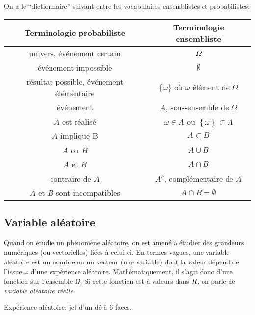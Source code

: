  
On a le ``dictionnaire'' suivant entre les vocabulaires ensemblistes et probabilistes:
\begin{center}
\begin{tabular}{cc}
\hline Terminologie probabiliste & Terminologie ensembliste \\
\hline
univers, événement certain& $\Omega$ \\
événement impossible  & $\emptyset$ \\
résultat possible, événement élémentaire & $\{\omega\}$ où $\omega$ élément de  $\Omega$ \\
événement & $A$, sous-ensemble de  $\Omega$ \\
$A$  est réalisé & $\omega \in A$ ou $\left\{ \omega \right\} \subset A $\\
$A$  implique  B & $A \subset B$\\
$A$  ou  $B$ & $A \cup B$ \\
$A$  et  $B$ & $A \cap B$ \\
contraire de  $A$ & $A^c$, complémentaire de  $A$ \\
$A$  et  $B$  sont incompatibles & $A \cap B = \emptyset$
\\ \hline
\end{tabular}
\end{center}

\sld{\vfill\pagebreak[5]}%

\subsection{Variable aléatoire}

Quand on étudie un phénomène aléatoire, on est amené à étudier des grandeurs numériques (ou vectorielles) liées à celui-ci. En termes vagues, une variable aléatoire est un nombre ou un vecteur (une variable) dont la valeur dépend de l'issue $\omega$ d'une expérience aléatoire. Mathématiquement, il s'agit donc d'une fonction sur l'ensemble $\Omega$. Si cette fonction est à valeurs dans $R$, on parle de \emph{variable aléatoire réelle}. %

\begin{exemple}
	 Expérience aléatoire: jet d'un dé à 6 faces. 
 \pl{\rep{4cm}}
\end{exemple}

